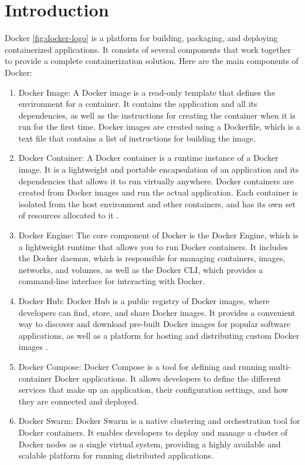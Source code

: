 \section{Introduction}

Docker \ref{fig:docker-logo} is a platform for building, packaging, and deploying containerized applications. It consists of several components that work together to provide a complete containerization solution. Here are the main components of Docker:
\begin{enumerate}
    \item Docker Image: A Docker image is a read-only template that defines the environment for a container. It contains the application and all its dependencies, as well as the instructions for creating the container when it is run for the first time. Docker images are created using a Dockerfile, which is a text file that contains a list of instructions for building the image.
    \item Docker Container: A Docker container is a runtime instance of a Docker image. It is a lightweight and portable encapsulation of an application and its dependencies that allows it to run virtually anywhere. Docker containers are created from Docker images and run the actual application. Each container is isolated from the host environment and other containers, and has its own set of resources allocated to it \citep{9514041}.
    \item Docker Engine: The core component of Docker is the Docker Engine, which is a lightweight runtime that allows you to run Docker containers. It includes the Docker daemon, which is responsible for managing containers, images, networks, and volumes, as well as the Docker CLI, which provides a command-line interface for interacting with Docker.
    \item Docker Hub: Docker Hub is a public registry of Docker images, where developers can find, store, and share Docker images. It provides a convenient way to discover and download pre-built Docker images for popular software applications, as well as a platform for hosting and distributing custom Docker images \citet{9236837}.
    \item Docker Compose: Docker Compose is a tool for defining and running multi-container Docker applications. It allows developers to define the different services that make up an application, their configuration settings, and how they are connected and deployed.
    \item Docker Swarm: Docker Swarm is a native clustering and orchestration tool for Docker containers. It enables developers to deploy and manage a cluster of Docker nodes as a single virtual system, providing a highly available and scalable platform for running distributed applications.

\end{enumerate}
